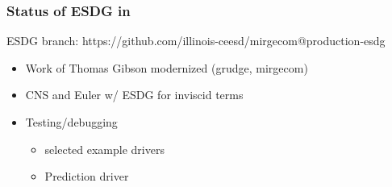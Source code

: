       
\begin{frame}\frametitle{Status of ESDG in \mirgecom{}}
\vspace{15pt}
\begin{center}
\mirgecom{} ESDG branch: https://github.com/illinois-ceesd/mirgecom@production-esdg
\end{center}
\begin{itemize}
\item Work of Thomas Gibson modernized (grudge, mirgecom)
\item CNS and Euler w/ ESDG for inviscid terms
\item Testing/debugging
\begin{itemize}
\item selected \mirgecom{} example drivers
\item Prediction driver
\end{itemize}
\end{itemize}
\end{frame}

